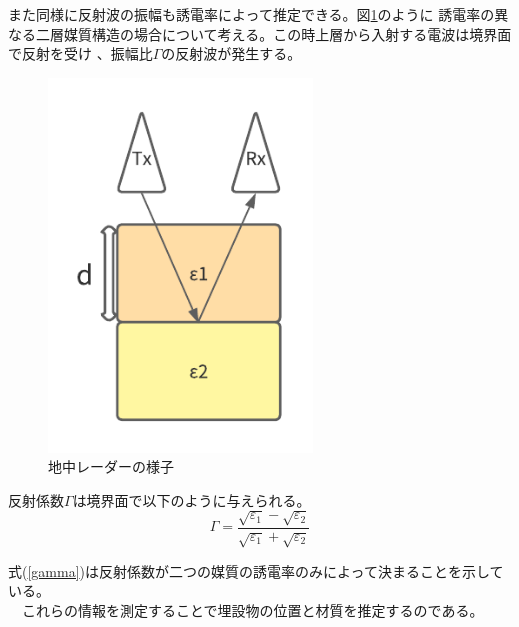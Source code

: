 \documentclass[a4paper,12pt]{jsreport}
\begin{document}
また同様に反射波の振幅も誘電率によって推定できる。図\ref{地中レーダーの様子}のように
誘電率の異なる二層媒質構造の場合について考える。この時上層から入射する電波は境界面で反射を受け
、振幅比$\Gamma$の反射波が発生する。

\begin{figure}[h]
  \begin{center}
   \includegraphics[width=7cm]{./image/radar.pdf}
   
  \caption{地中レーダーの様子}\label{地中レーダーの様子}
  \end{center}
  \end{figure}

反射係数$\Gamma$は境界面で以下のように与えられる。
\begin{equation}
  \Gamma=
  \frac{\sqrt{\varepsilon_{1}}-\sqrt{\varepsilon_{2}}}{\sqrt{\varepsilon_{1}}+\sqrt{\varepsilon_{2}}} 
\label{gamma}  
\end{equation}


式(\ref{gamma})は反射係数が二つの媒質の誘電率のみによって決まることを示している。
\\　これらの情報を測定することで埋設物の位置と材質を推定するのである。
\end{document}
